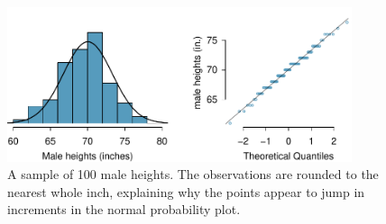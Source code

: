 \vspace{-0.75cm}
\begin{figure}[H]
\centering
\includegraphics[width=0.9\textwidth]{03/figures/fcidMHeights/fcidMHeights}
\caption{A sample of 100 male heights. The observations are rounded to the nearest whole inch, explaining why the points appear to jump in increments in the normal probability plot.}
\label{fcidMHeights}
\end{figure}

